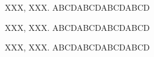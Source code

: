 \begin{publications}
    \begin{enumerate}[label={[\arabic*]}, leftmargin=5em, align=left]
        \item XXX, XXX. ABCDABCDABCDABCD
        \item XXX, XXX. ABCDABCDABCDABCD
        \item XXX, XXX. ABCDABCDABCDABCD
    \end{enumerate}
\end{publications}
